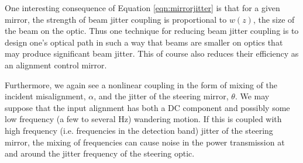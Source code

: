 One interesting consequence of Equation \ref{eqn:mirrorjitter} is that for a given mirror, the strength of beam jitter coupling is proportional to $w(z)$, the size of the beam on the optic. %
Thus one technique for reducing beam jitter coupling is to design one's optical path in such a way that beams are smaller on optics that may produce significant beam jitter. %
This of course also reduces their efficiency as an alignment control mirror.

Furthermore, we again see a nonlinear coupling in the form of mixing of the incident misalignment, $\alpha$, and the jitter of the steering mirror, $\theta$. %
We may suppose that the input alignment has both a DC component and possibly some low frequency (a few to several Hz) wandering motion. %
If this is coupled with high frequency (i.e. %
frequencies in the detection band) jitter of the steering mirror, the mixing of frequencies can cause noise in the power transmission at and around the jitter frequency of the steering optic.


